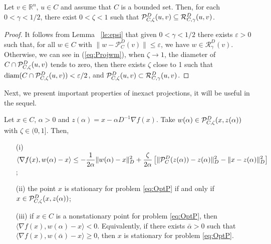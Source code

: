 \begin{proposition} \label{le:pcr}
	Let $v \in {\mathbb R}^n$, $u \in C$ and assume that $C$ is a bounded set. Then, for each $0<\gamma < 1/2$,     there exist $0 < \zeta  <1$ such that    ${\cal P}_{C,\zeta}^{D}(u, v)  \subseteq    {\cal R}_{C,\gamma}^{D}(u, v)$.
\end{proposition}
\begin{proof}
	It follows from Lemma~ \ref{le:epsi}  that given $0<\gamma<1/2$ there exists $\varepsilon>0$ such that,  for all $w\in C$  with $\|w-\mathcal{P}_C^D(v)\|\leq \varepsilon$, we have  $w\in\mathcal{R}_\gamma^D(v)$. Otherwise,  we can see in (\ref{eq:Projwm}), when $\zeta\to 1$, the diameter of $C\cap{\cal P}_{C,\zeta}^{D}(u, v)$ tends to zero, then there exists  $\zeta$ close to 1 such that $\mbox{diam}(C\cap{\cal P}_{C,\zeta}^{D}(u, v))<\varepsilon/2$, and ${\cal P}_{C,\zeta}^{D}(u, v) \subset {\cal R}_{C,\gamma}^{D}(u, v)$.
\end{proof}
Next, we present  important properties of  inexact projections,  it  will be useful in  the sequel.
\begin{lemma} \label{Le:ProjProperty}
	Let $x \in C$, $\alpha > 0$ and  $z(\alpha) = x-\alpha D^{-1} \nabla f(x)$. Take $w(\alpha) \in  {\cal P}_{C,\zeta}^{D}(x, z(\alpha))$ with $\zeta\in (0, 1]$. Then, 
	\begin{itemize}
		\item[(i)] $\displaystyle \langle \nabla f(x), w(\alpha) - x\rangle \leq -\frac{1}{2\alpha} \|w(\alpha) -x\|_{D}^2 +   \frac{\zeta}{2\alpha} \left[\| {\cal P}_{C}^{D}(z(\alpha))-z(\alpha)\|_{D}^2 - \|x-z(\alpha)\|_{D}^2\right]$;
		\item[(ii)] the point $x$ is stationary for problem \eqref{eq:OptP} if and only if $x \in {\cal P}_{C,\zeta}^{D}(x, z(\alpha))$;
		\item[(iii)] if  $x \in C$ is a nonstationary point for problem \eqref{eq:OptP}, then $\Big\langle \nabla f(x), w(\alpha) - x \Big\rangle < 0$. Equivalently, if there exists ${\bar \alpha}>0$ such that $\Big\langle \nabla f(x), w({\bar \alpha}) - x \Big\rangle \geq 0$, then $x$ is stationary for problem \eqref{eq:OptP}.
	\end{itemize}
\end{lemma}
